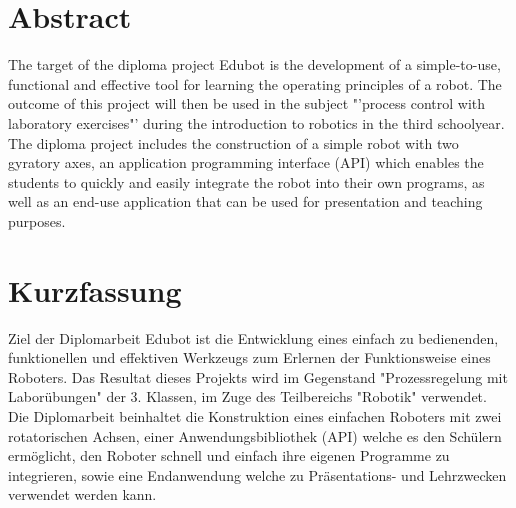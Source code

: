 
{}

\section*{Abstract}
The target of the diploma project Edubot is the development of a simple-to-use, functional and effective tool for learning the operating principles of a robot. The outcome of this project will then be used in the subject "'process control with laboratory exercises"' during the introduction to robotics in the third schoolyear. The diploma project includes the construction of a simple robot with two gyratory axes, an application programming interface (API) which enables the students to quickly and easily integrate the robot into their own programs, as well as an end-use application that can be used for presentation and teaching purposes. 

\section*{Kurzfassung}
Ziel der Diplomarbeit Edubot ist die Entwicklung eines einfach zu bedienenden, funktionellen und effektiven Werkzeugs zum Erlernen der Funktionsweise eines Roboters. Das Resultat dieses Projekts wird im Gegenstand "Prozessregelung mit Laborübungen" der 3. Klassen, im Zuge des Teilbereichs "Robotik" verwendet. Die Diplomarbeit beinhaltet die Konstruktion eines einfachen Roboters mit zwei rotatorischen Achsen, einer Anwendungsbibliothek (API) welche es den Schülern ermöglicht, den Roboter schnell und einfach ihre eigenen Programme zu integrieren, sowie eine Endanwendung welche zu Präsentations- und Lehrzwecken verwendet werden kann.


%
%